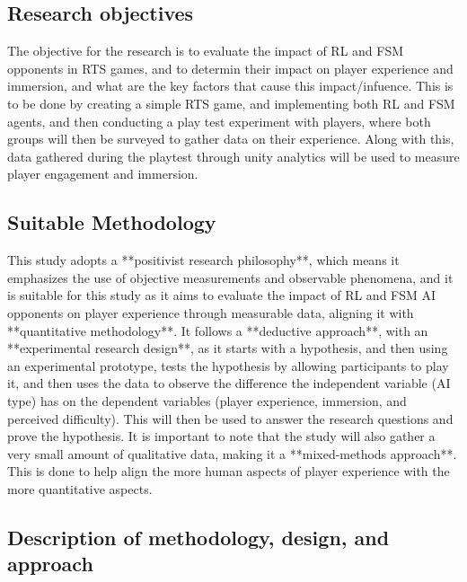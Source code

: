 \documentclass[conference]{IEEEtran}
\begin{document}
\subsection{Research objectives}

The objective for the research is to evaluate the impact of RL and FSM opponents in RTS games, and to determin their impact on player experience and immersion,
and what are the key factors that cause this impact/infuence. This is to be done by creating a simple RTS game, and implementing both RL and FSM agents,
and then conducting a play test experiment with players, where both groups will then be surveyed to gather data on their experience. Along with this,
data gathered during the playtest through unity analytics will be used to measure player engagement and immersion.

\subsection{Suitable Methodology}

This study adopts a **positivist research philosophy**, which means it emphasizes the use of objective measurements and observable phenomena, and it is suitable for this study as it aims
to evaluate the impact of RL and FSM AI opponents on player experience through measurable data, aligning it with **quantitative methodology**. It follows a **deductive approach**, with an **experimental research design**,
as it starts with a hypothesis, and then using an experimental prototype, tests the hypothesis by allowing participants to play it, and then uses the data to observe the difference the independent variable (AI type)
has on the dependent variables (player experience, immersion, and perceived difficulty). This will then be used to answer the research questions and prove the hypothesis. It is important to note that the study
will also gather a very small amount of qualitative data, making it a **mixed-methods approach**. This is done to help align the more human aspects of player experience with the more quantitative aspects.

\subsection{Description of methodology, design, and approach}
\end{document}
